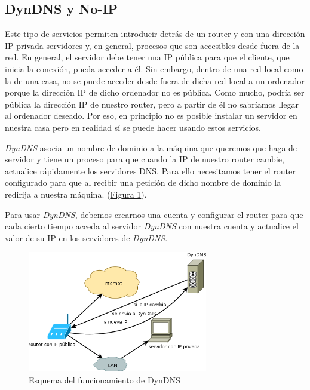 \documentclass[10pt,a4paper,spanish]{report}
\begin{document}
\subsection{\textcolor{tema2}DynDNS y No-IP}
Este tipo de servicios permiten introducir detrás de un router y con una dirección IP privada servidores y, en general, procesos que son accesibles desde fuera de la red. En general, el servidor debe tener una IP pública para que el cliente, que inicia la conexión, pueda acceder a él. Sin embargo, dentro de una red local como la de una casa, no se puede acceder desde fuera de dicha red local a un ordenador porque la dirección IP de dicho ordenador no es pública. Como mucho, podría ser pública la dirección IP de nuestro router, pero a partir de él no sabríamos llegar al ordenador deseado. Por eso, en principio no es posible instalar un servidor en nuestra casa pero en realidad sí se puede hacer usando estos servicios.

\textcolor{tema2}{\textit{DynDNS}} asocia un nombre de dominio a la máquina que queremos que haga de servidor y tiene un proceso para que cuando la IP de nuestro router cambie, actualice rápidamente los servidores DNS. Para ello necesitamos tener el router configurado para que al recibir una petición de dicho nombre de dominio la redirija a nuestra máquina. (\hyperref[dyndns]{Figura \ref*{dyndns}}). 

Para usar \textcolor{tema2}{\textit{DynDNS}}, debemos crearnos una cuenta y configurar el router para que cada cierto tiempo acceda al servidor \textcolor{tema2}{\textit{DynDNS}} con nuestra cuenta y actualice el valor de su IP en los servidores de \textit{\textcolor{tema2}{DynDNS}}. 

\begin{figure}[!h]
  \centering
  \includegraphics[width=0.7\textwidth]{dyndns}
  \caption{Esquema del funcionamiento de DynDNS}
  \label{dyndns}
\end{figure}
\end{document}
